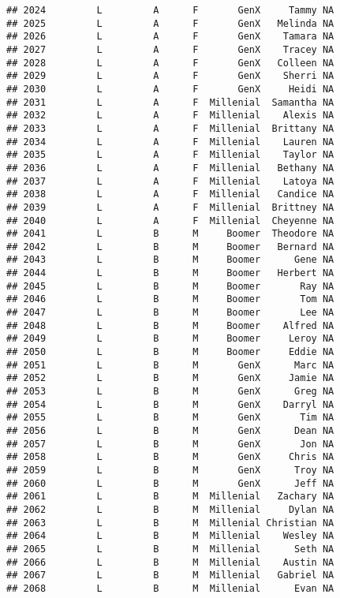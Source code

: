 \documentclass[
]{article}
\begin{document}
\begin{verbatim}
## 2024         L         A      F       GenX     Tammy NA
## 2025         L         A      F       GenX   Melinda NA
## 2026         L         A      F       GenX    Tamara NA
## 2027         L         A      F       GenX    Tracey NA
## 2028         L         A      F       GenX   Colleen NA
## 2029         L         A      F       GenX    Sherri NA
## 2030         L         A      F       GenX     Heidi NA
## 2031         L         A      F  Millenial  Samantha NA
## 2032         L         A      F  Millenial    Alexis NA
## 2033         L         A      F  Millenial  Brittany NA
## 2034         L         A      F  Millenial    Lauren NA
## 2035         L         A      F  Millenial    Taylor NA
## 2036         L         A      F  Millenial   Bethany NA
## 2037         L         A      F  Millenial    Latoya NA
## 2038         L         A      F  Millenial   Candice NA
## 2039         L         A      F  Millenial  Brittney NA
## 2040         L         A      F  Millenial  Cheyenne NA
## 2041         L         B      M     Boomer  Theodore NA
## 2042         L         B      M     Boomer   Bernard NA
## 2043         L         B      M     Boomer      Gene NA
## 2044         L         B      M     Boomer   Herbert NA
## 2045         L         B      M     Boomer       Ray NA
## 2046         L         B      M     Boomer       Tom NA
## 2047         L         B      M     Boomer       Lee NA
## 2048         L         B      M     Boomer    Alfred NA
## 2049         L         B      M     Boomer     Leroy NA
## 2050         L         B      M     Boomer     Eddie NA
## 2051         L         B      M       GenX      Marc NA
## 2052         L         B      M       GenX     Jamie NA
## 2053         L         B      M       GenX      Greg NA
## 2054         L         B      M       GenX    Darryl NA
## 2055         L         B      M       GenX       Tim NA
## 2056         L         B      M       GenX      Dean NA
## 2057         L         B      M       GenX       Jon NA
## 2058         L         B      M       GenX     Chris NA
## 2059         L         B      M       GenX      Troy NA
## 2060         L         B      M       GenX      Jeff NA
## 2061         L         B      M  Millenial   Zachary NA
## 2062         L         B      M  Millenial     Dylan NA
## 2063         L         B      M  Millenial Christian NA
## 2064         L         B      M  Millenial    Wesley NA
## 2065         L         B      M  Millenial      Seth NA
## 2066         L         B      M  Millenial    Austin NA
## 2067         L         B      M  Millenial   Gabriel NA
## 2068         L         B      M  Millenial      Evan NA

\end{verbatim}
\end{document}
